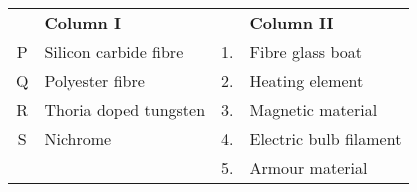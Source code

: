\begin{tabular}{clcl}
&\textbf{Column I} & & \textbf{Column II}  \\
P & Silicon carbide fibre & 1. & Fibre glass boat \\
Q & Polyester fibre & 2. & Heating element \\
R & Thoria doped tungsten & 3. & Magnetic material \\
S & Nichrome & 4. & Electric bulb filament \\
&&5.&Armour material
\end{tabular}
